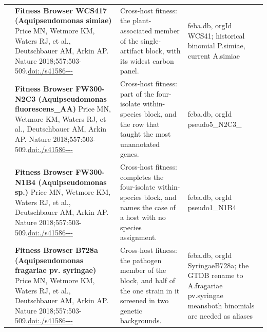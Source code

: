 \begin{landscape}
\begin{longtable}{@{}r@{\hspace{4pt}} L{78mm} L{72mm} L{76mm}@{}}
 & \textbf{Fitness Browser WCS417 (Aquipseudomonas simiae)} \newline Price MN, Wetmore KM, Waters RJ, et al., Deutschbauer AM, Arkin AP. Nature 2018;557:503-509.\newline \href{https://doi.org/10.1038/s41586-018-0124-0}{doi:./\allowbreak s41586---} & Cross-host fitness: the plant-associated member of the single-artifact block, with its widest carbon panel. & feba.\allowbreak db, org\allowbreak Id WCS41; histo\allowbreak rical bi\allowbreak nomial P\allowbreak .\allowbreak  simiae\allowbreak , curren\allowbreak t A.\allowbreak  simiae \\
 & \textbf{Fitness Browser FW300-N2C3 (Aquipseudomonas fluorescens\_AA)} \newline Price MN, Wetmore KM, Waters RJ, et al., Deutschbauer AM, Arkin AP. Nature 2018;557:503-509.\newline \href{https://doi.org/10.1038/s41586-018-0124-0}{doi:./\allowbreak s41586---} & Cross-host fitness: part of the four-isolate within-species block, and the row that taught the most unannotated genes. & feba.\allowbreak db, org\allowbreak Id pseud\allowbreak o5\_\allowbreak N2C3\_ \\
 & \textbf{Fitness Browser FW300-N1B4 (Aquipseudomonas sp.)} \newline Price MN, Wetmore KM, Waters RJ, et al., Deutschbauer AM, Arkin AP. Nature 2018;557:503-509.\newline \href{https://doi.org/10.1038/s41586-018-0124-0}{doi:./\allowbreak s41586---} & Cross-host fitness: completes the four-isolate within-species block, and names the case of a host with no species assignment. & feba.\allowbreak db, org\allowbreak Id pseud\allowbreak o1\_\allowbreak N1B4 \\
 & \textbf{Fitness Browser B728a (Aquipseudomonas fragariae pv. syringae)} \newline Price MN, Wetmore KM, Waters RJ, et al., Deutschbauer AM, Arkin AP. Nature 2018;557:503-509.\newline \href{https://doi.org/10.1038/s41586-018-0124-0}{doi:./\allowbreak s41586---} & Cross-host fitness: the pathogen member of the block, and half of the one strain in it screened in two genetic backgrounds. & feba.\allowbreak db, org\allowbreak Id Syrin\allowbreak gaeB728a\allowbreak ; the GT\allowbreak DB renam\allowbreak e to A.\allowbreak  fragar\allowbreak iae pv.\allowbreak  syring\allowbreak ae means\allowbreak  both bi\allowbreak nomials \allowbreak are need\allowbreak ed as al\allowbreak iases \\

\end{longtable}
\end{landscape}
